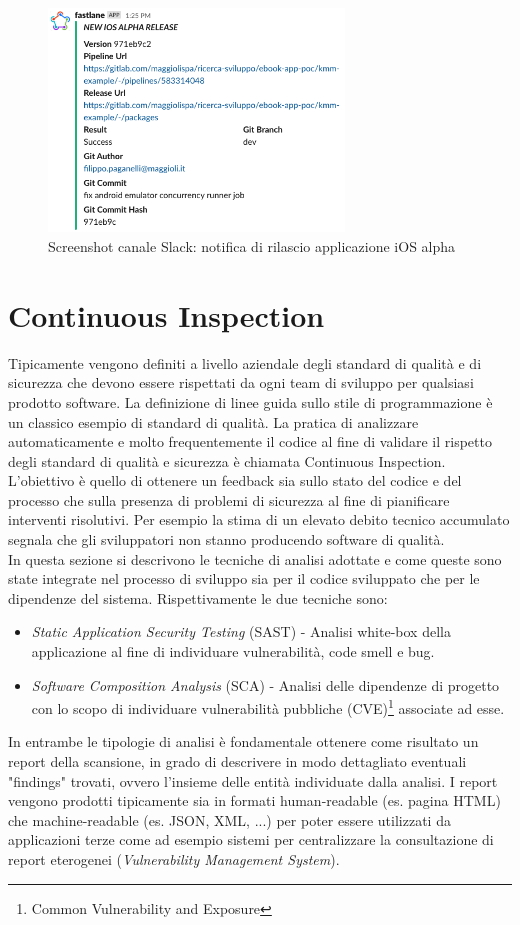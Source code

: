 \begin{figure}[H]
\centering
\includegraphics[width=0.7\textwidth]{img/Screenshot 2022-07-08 at 17.48.40.png}
\caption{Screenshot canale Slack: notifica di rilascio applicazione iOS alpha}
\end{figure}

\section{Continuous Inspection}
Tipicamente vengono definiti a livello aziendale degli standard di qualità e di sicurezza che devono essere rispettati da ogni team di sviluppo per qualsiasi prodotto software. La definizione di linee guida sullo stile di programmazione è un classico esempio di standard di qualità. La pratica di analizzare automaticamente e molto frequentemente il codice al fine di validare il rispetto degli standard di qualità e sicurezza è chiamata Continuous Inspection.
L'obiettivo è quello di ottenere un feedback sia sullo stato del codice e del processo che sulla presenza di problemi di sicurezza al fine di pianificare interventi risolutivi. Per esempio la stima di un elevato debito tecnico accumulato segnala che gli sviluppatori non stanno producendo software di qualità.\\
In questa sezione si descrivono le tecniche di analisi adottate e come queste sono state integrate nel processo di sviluppo sia per il codice sviluppato che per le dipendenze del sistema. Rispettivamente le due tecniche sono:
\begin{itemize}
    \item \textit{Static Application Security Testing} (SAST) - Analisi white-box della applicazione al fine di individuare vulnerabilità, code smell e bug.
    \item \textit{Software Composition Analysis} (SCA) - Analisi delle dipendenze di progetto con lo scopo di individuare vulnerabilità pubbliche (CVE)\footnote{Common Vulnerability and Exposure} associate ad esse.
\end{itemize}
In entrambe le tipologie di analisi è fondamentale ottenere come risultato un report della scansione, in grado di descrivere in modo dettagliato eventuali "findings" trovati, ovvero l'insieme delle entità individuate dalla analisi. I report vengono prodotti tipicamente sia in formati human-readable (es. pagina HTML) che machine-readable (es. JSON, XML, ...) per poter essere utilizzati da applicazioni terze come ad esempio sistemi per centralizzare la consultazione di report eterogenei (\textit{Vulnerability Management System}).

